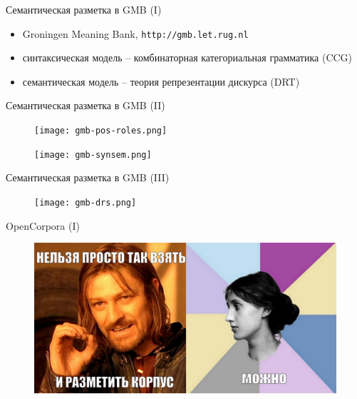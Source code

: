 \documentclass{beamer}
\begin{document}
\begin{frame}{Семантическая разметка в GMB (I)}
\begin{itemize}
	\item Groningen Meaning Bank, \texttt{http://gmb.let.rug.nl}
	\item синтаксическая модель -- комбинаторная категориальная грамматика (CCG)
	\item семантическая модель -- теория репрезентации дискурса (DRT)
\end{itemize}
\end{frame}

\begin{frame}{Семантическая разметка в GMB (II)}
\begin{center}
	\begin{figure}[H]
		\texttt{[image: gmb-pos-roles.png]} 
	\end{figure}
	\begin{figure}[H]
		\texttt{[image: gmb-synsem.png]} 
	\end{figure}
\end{center}
\end{frame}

\begin{frame}{Семантическая разметка в GMB (III)}
\begin{center}
	\begin{figure}[H]
		\texttt{[image: gmb-drs.png]} 
	\end{figure}
\end{center}
\end{frame}

\begin{frame}{OpenCorpora (I)}
\begin{center}
	\begin{figure}[H]
		\includegraphics[scale=0.12]{yes-we-can.jpg} 
	\end{figure}
\end{center}
\end{frame}
\end{document}
